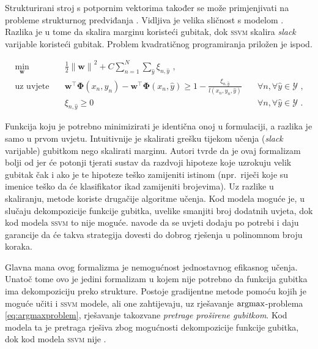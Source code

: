 Strukturirani stroj s potpornim vektorima  također se može primjenjivati na probleme strukturnog predviđanja
\citep{tsochantaridis2005large}. Vidljiva je velika sličnost s modelom \mmmm{}.
Razlika je u tome da \mmmm{} skalira marginu koristeći gubitak, dok
\textsc{ssvm} skalira \textit{slack} varijable koristeći gubitak. Problem
kvadratičnog programiranja priložen je ispod.

\begin{equation}\label{eq:ssvm}
\begin{aligned}
  \min_{\mathbf{w}} & \quad \frac{1}{2} {\lVert\mathbf{w}\lVert}^2 + C \sum_{n=1}^{N}\sum_{\hat{y}} \xi_{n,\hat{y}} \text{ ,}              & \\
  \text{uz uvjete}  & \quad \mathbf{w}^\top \mathbf{\Phi}(x_n, y_n) - \mathbf{w}^\top \mathbf{\Phi}(x_n, \hat{y}) \ge 1 - \frac{\xi_{n,\hat{y}}}{l(x_n, y_n, \hat{y})} & \quad \forall n, \forall \hat{y} \in \mathcal{Y} \text{ ,}\\
                    & \quad \xi_{n,\hat{y}} \ge 0                                                                                          & \quad \forall n, \forall \hat{y} \in \mathcal{Y} \text{ .}
\end{aligned}
\end{equation}

\noindent
Funkcija koju je potrebno minimizirati je identična onoj u \mmmm{} formulaciji, a
razlika je samo u prvom uvjetu. Intuitivnije je skalirati grešku tijekom učenja
(\textit{slack} varijable) gubitkom nego skalirati marginu. Autori tvrde da je
ovaj formalizam bolji od \mmmm{} jer će potonji tjerati sustav da razdvoji
hipoteze koje uzrokuju velik gubitak čak i ako je te hipoteze teško zamijeniti
istinom (npr.~riječi koje su imenice teško da će klasifikator ikad zamijeniti
brojevima). Uz razlike u skaliranju, metode koriste drugačije algoritme učenja.
Kod \mmmm{} modela moguće je, u slučaju dekompozicije funkcije gubitka, uvelike
smanjiti broj dodatnih uvjeta, dok kod modela \textsc{ssvm} to nije moguće.
\citet{tsochantaridis2005large} navode da se uvjeti dodaju po potrebi i daju
garancije da će takva strategija dovesti do dobrog rješenja u polinomnom broju
koraka.

Glavna mana ovog formalizma je nemogućnost jednostavnog efikasnog učenja. Unatoč
tome ovo je jedini formalizam u kojem nije potrebno da funkcija gubitka ima
dekompoziciju preko strukture. Postoje gradijentne metode pomoću kojih je moguće
učiti \mmmm{} i \textsc{ssvm} modele, ali one zahtijevaju, uz rješavanje
$\operatorname*{argmax}$-problema \ref{eq:argmaxproblem}, rješavanje takozvane \textit{pretrage
proširene gubitkom}. Kod \mmmm{} modela ta je pretraga rješiva zbog mogućnosti
dekompozicije funkcije gubitka, dok kod modela \textsc{ssvm} nije
\citep{ratliff2006maximum}.
